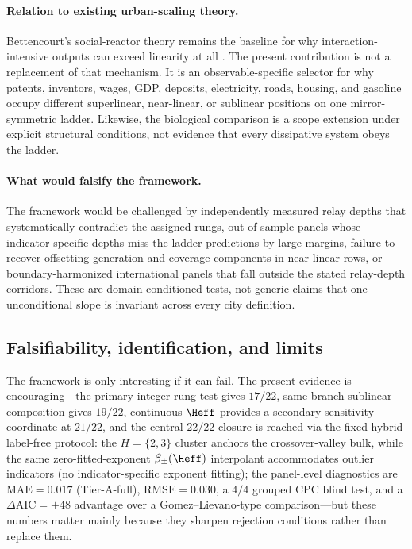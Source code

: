 \paragraph{Relation to existing urban-scaling theory.}
Bettencourt's social-reactor theory remains the baseline for why
interaction-intensive outputs can exceed linearity at all
\citep{Bettencourt2007,Bettencourt2013}.  The present contribution is not a
replacement of that mechanism.  It is an observable-specific selector for why
patents, inventors, wages, GDP, deposits, electricity, roads, housing, and
gasoline occupy different superlinear, near-linear, or sublinear positions on
one mirror-symmetric ladder.  Likewise, the biological comparison is a scope
extension under explicit structural conditions, not evidence that every
dissipative system obeys the ladder.

\paragraph{What would falsify the framework.}
The framework would be challenged by independently measured relay depths
that systematically contradict the assigned rungs, out-of-sample panels
whose indicator-specific depths miss the ladder predictions by large margins,
failure to recover offsetting generation and coverage components in
near-linear rows, or boundary-harmonized international panels that fall
outside the stated relay-depth corridors.  These are domain-conditioned
tests, not generic claims that one unconditional slope is invariant across
every city definition.

\subsection{Falsifiability, identification, and limits}
The framework is only interesting if it can fail. The present evidence is
encouraging---the primary integer-rung test gives $17/22$, same-branch
sublinear composition gives $19/22$, continuous $\Heff$ provides a
secondary sensitivity coordinate at $21/22$, and the central $22/22$
closure is reached via the fixed hybrid label-free protocol: the
$H{=}\{2,3\}$ cluster anchors the crossover-valley bulk, while the
same zero-fitted-exponent $\beta_{\pm}(\Heff)$ interpolant accommodates
outlier indicators (no indicator-specific exponent fitting); the panel-level diagnostics are
$\mathrm{MAE}=0.017$ (Tier-A-full), $\mathrm{RMSE}=0.030$, a $4/4$ grouped CPC blind
test, and a $\Delta\mathrm{AIC}=+48$ advantage over a Gomez--Lievano-type
comparison---but these numbers matter
mainly because they sharpen rejection conditions rather than replace them.

